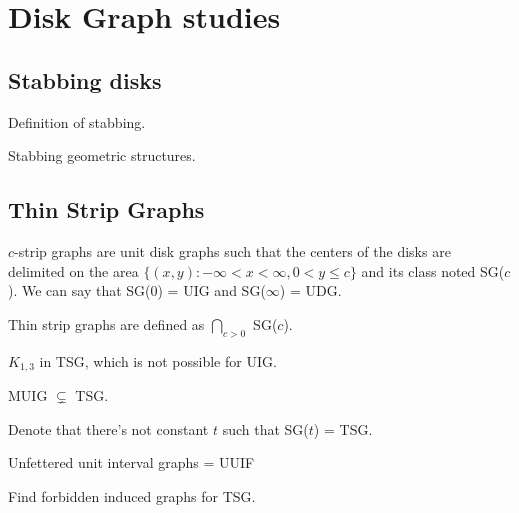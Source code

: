 \chapter{Disk Graph studies}

\section{Stabbing disks}

Definition of stabbing.

Stabbing geometric structures.\cite{schlipf2013stabbing}

\section{Thin Strip Graphs}

$c$-strip graphs are unit disk graphs such that the centers of the disks are delimited on the area $\{(x,y) : -\infty < x < \infty, 0 < y \leq c\}$ and its class noted SG($c$). We can say that SG(0) = UIG and SG($\infty$) = UDG. \cite{hayashiThinStripGraphs2017}

Thin strip graphs are defined as $\bigcap_{c > 0}$ SG($c$).

$K_{1,3}$ in TSG, which is not possible for UIG.

MUIG $\subsetneq$ TSG.

Denote that there's not constant $t$ such that SG($t$) = TSG. 

Unfettered unit interval graphs = UUIF

\begin{definition}
  Find forbidden induced graphs for TSG.
\end{definition}
